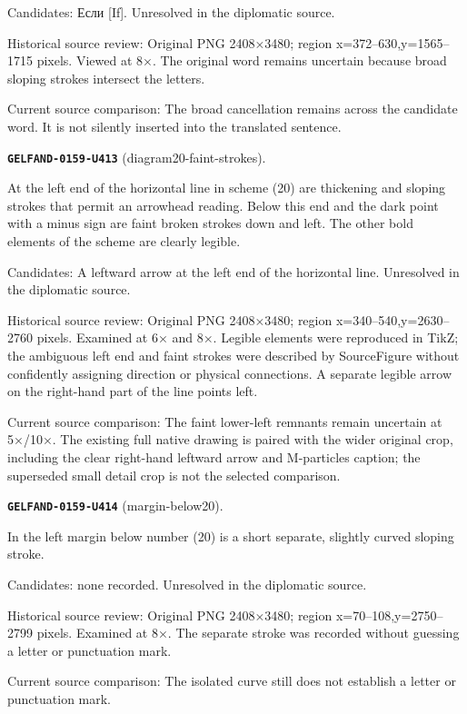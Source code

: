 Candidates: Если [If]. Unresolved in the diplomatic source.\par
Historical source review: Original PNG 2408×3480; region x=372–630,y=1565–1715 pixels. Viewed at 8×. The original word remains uncertain because broad sloping strokes intersect the letters.\par
Current source comparison: The broad cancellation remains across the candidate word. It is not silently inserted into the translated sentence.\par\medskip
\par\noindent\leavevmode{}\label{GELFAND-0159-U413}\label{GELFAND-P001471:diagram20-faint-strokes}\textbf{\texttt{GELFAND-0159-U413}} (diagram20-faint-strokes).\nopagebreak[4]\par
At the left end of the horizontal line in scheme (20) are thickening and sloping strokes that permit an arrowhead reading. Below this end and the dark point with a minus sign are faint broken strokes down and left. The other bold elements of the scheme are clearly legible.\par
Candidates: A leftward arrow at the left end of the horizontal line. Unresolved in the diplomatic source.\par
Historical source review: Original PNG 2408×3480; region x=340–540,y=2630–2760 pixels. Examined at 6× and 8×. Legible elements were reproduced in TikZ; the ambiguous left end and faint strokes were described by SourceFigure without confidently assigning direction or physical connections. A separate legible arrow on the right-hand part of the line points left.\par
Current source comparison: The faint lower-left remnants remain uncertain at 5×/10×. The existing full native drawing is paired with the wider original crop, including the clear right-hand leftward arrow and M-particles caption; the superseded small detail crop is not the selected comparison.\par\medskip
\par\noindent\leavevmode{}\label{GELFAND-0159-U414}\label{GELFAND-P001471:margin-below20}\textbf{\texttt{GELFAND-0159-U414}} (margin-below20).\nopagebreak[4]\par
In the left margin below number (20) is a short separate, slightly curved sloping stroke.\par
Candidates: none recorded. Unresolved in the diplomatic source.\par
Historical source review: Original PNG 2408×3480; region x=70–108,y=2750–2799 pixels. Examined at 8×. The separate stroke was recorded without guessing a letter or punctuation mark.\par
Current source comparison: The isolated curve still does not establish a letter or punctuation mark.\par\medskip
